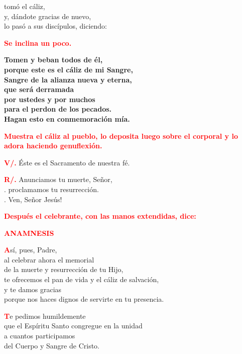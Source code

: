 \documentclass[12pt, letterpaper]{report}
\begin{document}
\Large tom\'o el c\'aliz,\\
y, d\'andote gracias de nuevo,\\
lo pas\'o a sus disc\'ipulos, diciendo:

\large{\bfseries \textcolor{red}{Se inclina un poco.}}

\LARGE{ \bfseries{ Tomen y beban todos de \'el,\\
porque este es el c\'aliz de mi Sangre,\\
Sangre de la alianza nueva y eterna,\\
que ser\'a derramada\\
por ustedes y por muchos\\
para el perdon de los pecados.\\
Hagan esto en conmemoraci\'on m\'ia.}}

\large{\bfseries \textcolor{red}{Muestra el c\'aliz al pueblo, lo deposita luego sobre el corporal y lo adora haciendo genuflexi\'on.}}

\noindent
\Large {\bfseries \textcolor{red}{V/.}} \hspace{0.5cm} \'Este es el Sacramento de nuestra f\'e.

\noindent
\Large {\bfseries \textcolor{red}{R/.}} \hspace{0.5cm} Anunciamos tu muerte, Se\~nor,\\
. \hspace{1.5cm} proclamamos tu resurrecci\'on.\\
. \hspace{1.5cm} Ven, Se\~nor Jes\'us!

\large{\bfseries \textcolor{red}{Despu\'es el celebrante, con las manos extendidas, dice:}} 

\Large {\bfseries \textcolor{red}{ANAMNESIS}}

\lettrine[lines=1]{\bfseries \textcolor{red}{A}}{}\Large s\'i, pues, Padre,\\
al celebrar ahora el memorial\\
de la muerte y resurrecci\'on de tu Hijo,\\
te ofrecemos el pan de vida y el c\'aliz de salvaci\'on,\\
y te damos gracias\\
porque nos haces dignos de servirte en tu presencia.

\lettrine[lines=1]{\bfseries \textcolor{red}{T}}{}\Large e pedimos humildemente\\
que el Esp\'iritu Santo congregue en la unidad\\
a cuantos participamos\\
del Cuerpo y Sangre de Cristo.
\end{document}
